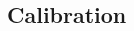 \documentclass[a0,landscape]{a0poster}
\begin{document}
\begin{multicols}{4}

\section*{Calibration}



\end{multicols}
\end{document}
